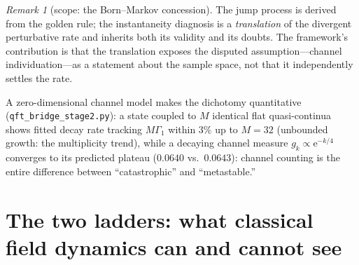 \documentclass[11pt]{article}
\theoremstyle{definition}
\theoremstyle{remark}
\newtheorem{remark}[theorem]{Remark}
\newcommand{\ee}{\mathrm{e}}
\begin{document}
\begin{remark}[scope: the Born--Markov concession]
\label{rem:bornmarkov}
The jump process is derived from the golden rule; the instantaneity
diagnosis is a \emph{translation} of the divergent perturbative rate
and inherits both its validity and its doubts. The framework's
contribution is that the translation exposes the disputed
assumption---channel individuation---as a statement about the sample
space, not that it independently settles the rate.
\end{remark}

A zero-dimensional channel model makes the dichotomy quantitative
(\texttt{qft\_bridge\_stage2.py}): a state coupled to $M$ identical
flat quasi-continua shows fitted decay rate tracking $M\Gamma_1$
within $3\%$ up to $M=32$ (unbounded growth: the multiplicity trend),
while a decaying channel measure $g_k\propto\ee^{-k/4}$ converges to
its predicted plateau ($0.0640$ vs.\ $0.0643$): channel counting is
the entire difference between ``catastrophic'' and ``metastable.''

\section{The two ladders: what classical field dynamics can and
cannot see}
\label{sec:lattice}
\end{document}
